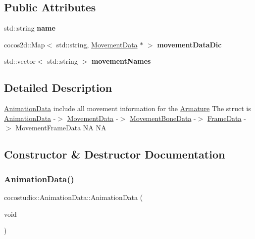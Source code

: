 \subsection*{Public Attributes}
\begin{DoxyCompactItemize}
\item 
\mbox{\label{classcocostudio_1_1AnimationData_ae4573de67d1039e00de80b2004afcdb3}} 
std\+::string {\bfseries name}
\item 
\mbox{\label{classcocostudio_1_1AnimationData_a1feec14276c7a8a51153ee5520665f1c}} 
cocos2d\+::\+Map$<$ std\+::string, \hyperlink{classcocostudio_1_1MovementData}{Movement\+Data} $\ast$ $>$ {\bfseries movement\+Data\+Dic}
\item 
\mbox{\label{classcocostudio_1_1AnimationData_a336a23edd27f9c428523d34b9f6039b5}} 
std\+::vector$<$ std\+::string $>$ {\bfseries movement\+Names}
\end{DoxyCompactItemize}


\subsection{Detailed Description}
\hyperlink{classcocostudio_1_1AnimationData}{Animation\+Data} include all movement information for the \hyperlink{classcocostudio_1_1Armature}{Armature} The struct is \hyperlink{classcocostudio_1_1AnimationData}{Animation\+Data} -\/$>$ \hyperlink{classcocostudio_1_1MovementData}{Movement\+Data} -\/$>$ \hyperlink{classcocostudio_1_1MovementBoneData}{Movement\+Bone\+Data} -\/$>$ \hyperlink{classcocostudio_1_1FrameData}{Frame\+Data} -\/$>$ Movement\+Frame\+Data  NA  NA 

\subsection{Constructor \& Destructor Documentation}
\mbox{\label{classcocostudio_1_1AnimationData_aab73e793e8c295358507c9809a5cad9c}} 
\subsubsection{\texorpdfstring{Animation\+Data()}{AnimationData()}\hspace{0.1cm}{\footnotesize\ttfamily [1/2]}}
{\footnotesize\ttfamily cocostudio\+::\+Animation\+Data\+::\+Animation\+Data (\begin{DoxyParamCaption}\item[{void}]{ }\end{DoxyParamCaption})}


